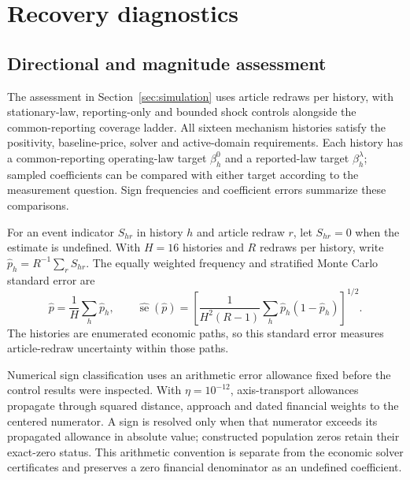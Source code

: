 \section{Recovery diagnostics}\label{app:recovery-diagnostics}

\subsection{Directional and magnitude assessment}\label{app:directional-diagnostics}

The assessment in Section~\ref{sec:simulation} uses
 article redraws per history, with
stationary-law, reporting-only and bounded shock controls alongside the
common-reporting coverage ladder.
All sixteen mechanism histories satisfy the positivity, baseline-price,
solver and active-domain requirements.
Each history has a common-reporting operating-law target $\beta_h^0$ and a
reported-law target $\beta_h^\lambda$; sampled coefficients can be
compared with either target according to the measurement question.
Sign frequencies and coefficient errors summarize these comparisons.

For an event indicator $S_{hr}$ in history $h$ and article redraw $r$, let
$S_{hr}=0$ when the estimate is undefined.
With $H=16$ histories and $R$ redraws per history, write
$\widehat p_h=R^{-1}\sum_r S_{hr}$.
The equally weighted frequency and stratified Monte Carlo standard error are
\begin{equation}\label{eq:sign-mcse}
  \widehat p=\frac1H\sum_h\widehat p_h,\qquad
  \widehat{\operatorname{se}}(\widehat p)=
  \left[\frac1{H^2(R-1)}\sum_h\widehat p_h(1-\widehat p_h)\right]^{1/2}.
\end{equation}
The histories are enumerated economic paths, so this standard error measures
article-redraw uncertainty within those paths.

Numerical sign classification uses an arithmetic error allowance fixed before
the control results were inspected.
With $\eta=10^{-12}$, axis-transport allowances propagate through squared
distance, approach and dated financial weights to the centered numerator.
A sign is resolved only when that numerator exceeds its propagated
allowance in absolute value; constructed population zeros retain their
exact-zero status.
This arithmetic convention is separate from the economic solver certificates
and preserves a zero financial denominator as an undefined coefficient.

